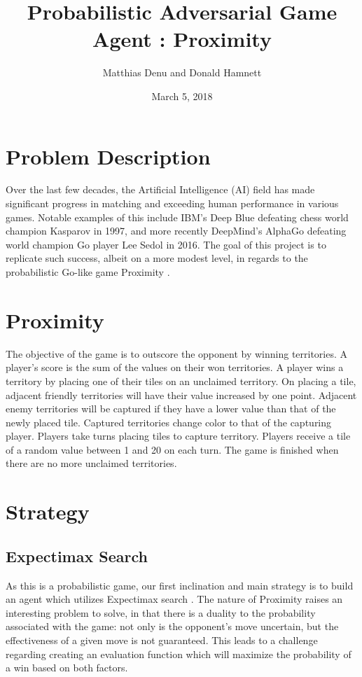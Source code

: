 \documentclass[10pt,letter]{article}
\begin{document}
\title{Probabilistic Adversarial Game Agent : Proximity}
\author{Matthias Denu and Donald Hamnett}
\date{March 5, 2018}
\maketitle
\begin{multicols}{2}
\section*{Problem Description}
\par
Over the last few decades, the Artificial Intelligence (AI) field has made significant progress in matching and exceeding human performance in various games. Notable examples of this include IBM's Deep Blue \cite{deepblue} defeating chess world champion Kasparov in 1997, and more recently DeepMind's AlphaGo \cite{alphago} defeating world champion Go player Lee Sedol in 2016. The goal of this project is to replicate such success, albeit on a more modest level, in regards to the probabilistic Go-like game Proximity \cite{proximity}.
\section*{Proximity}
\par
The objective of the game is to outscore the opponent by winning territories. A player's score is the sum of the values on their won territories. A player wins a territory by placing one of their tiles on an unclaimed territory. On placing a tile, adjacent friendly territories will have their value increased by one point. Adjacent enemy territories will be captured if they have a lower value than that of the newly placed tile. Captured territories change color to that of the capturing player. Players take turns placing tiles to capture territory. Players receive a tile of a random value between 1 and 20 on each turn. The game is finished when there are no more unclaimed territories\cite{proximity, bacable_2015}.
\section*{Strategy}
\subsection*{Expectimax Search}
\par
As this is a probabilistic game, our first inclination and main strategy is to build an agent which utilizes Expectimax search \cite{aima}. The nature of Proximity raises an interesting problem to solve, in that there is a duality to the probability associated with the game: not only is the opponent's move uncertain, but the effectiveness of a given move is not guaranteed. This leads to a challenge regarding creating an evaluation function which will maximize the probability of a win based on both factors.

\end{multicols}
\end{document}
